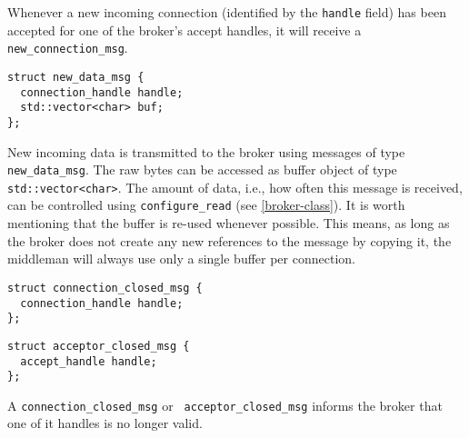 Whenever a new incoming connection (identified by the \lstinline^handle^ field) has been accepted for one of the broker's accept handles, it will receive a \lstinline^new_connection_msg^.

\begin{lstlisting}
struct new_data_msg {
  connection_handle handle;
  std::vector<char> buf;
};
\end{lstlisting}

New incoming data is transmitted to the broker using messages of type \lstinline^new_data_msg^.
The raw bytes can be accessed as buffer object of type \lstinline^std::vector<char>^.
The amount of data, i.e., how often this message is received, can be controlled using \lstinline^configure_read^ (see \ref{broker-class}).
It is worth mentioning that the buffer is re-used whenever possible.
This means, as long as the broker does not create any new references to the message by copying it, the middleman will always use only a single buffer per connection.

\begin{lstlisting}
struct connection_closed_msg {
  connection_handle handle;
};
\end{lstlisting}

\begin{lstlisting}
struct acceptor_closed_msg {
  accept_handle handle;
};
\end{lstlisting}


A \lstinline^connection_closed_msg^ or \lstinline^ acceptor_closed_msg^ informs the broker that one of it handles is no longer valid.
